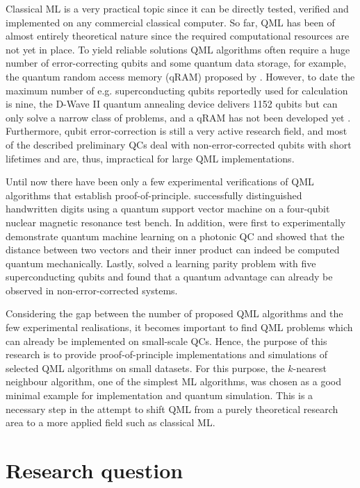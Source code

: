 Classical ML is a very practical topic since it can be directly tested, verified and implemented on any commercial classical computer. So far, QML has been of almost entirely theoretical nature since the required computational resources are not yet in place. To yield reliable solutions QML algorithms often require a huge number of error-correcting qubits and some quantum data storage, for example, the quantum random access memory (qRAM) proposed by . However, to date the maximum number of e.g. superconducting qubits reportedly used for calculation is nine, the D-Wave II quantum annealing device delivers 1152 qubits but can only solve a narrow class of problems, and a qRAM has not been developed yet \cite{hydrogensimulation, dwave2}. Furthermore, qubit error-correction is still a very active research field, and most of the described preliminary QCs deal with non-error-corrected qubits with short lifetimes and are, thus, impractical for large QML implementations.

Until now there have been only a few experimental verifications of QML algorithms that establish proof-of-principle.  successfully distinguished handwritten digits using a quantum support vector machine on a four-qubit nuclear magnetic resonance test bench. In addition,  were first to experimentally demonstrate quantum machine learning on a photonic QC and showed that the distance between two vectors and their inner product can indeed be computed quantum mechanically. Lastly,  solved a learning parity problem with five superconducting qubits and found that a quantum advantage can already be observed in non-error-corrected systems.

Considering the gap between the number of proposed QML algorithms and the few experimental realisations, it becomes important to find QML problems which can already be implemented on small-scale QCs. Hence, the purpose of this research is to provide proof-of-principle implementations and simulations of selected QML algorithms on small datasets. For this purpose, the $k$-nearest neighbour algorithm, one of the simplest ML algorithms, was chosen as a good minimal example for implementation and quantum simulation. This is a necessary step in the attempt to shift QML from a purely theoretical research area to a more applied field such as classical ML.

\section{Research question}
\label{sec:researchquestion}


